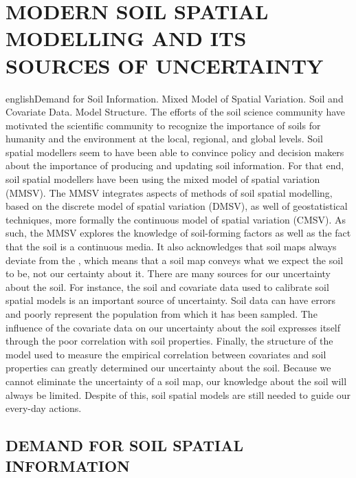 \artigotrue
\chapter{MODERN SOIL SPATIAL MODELLING AND ITS SOURCES OF UNCERTAINTY}
\label{chap:chap02}

\def\enkeys{Demand for Soil Information. Mixed Model of Spatial Variation. Soil and Covariate Data. Model 
Structure.}
  
\begin{chapterabstract}{english}{\enkeys}
The efforts of the soil science community have motivated the scientific community to recognize the importance 
of soils for humanity and the environment at the local, regional, and global levels. Soil spatial modellers 
seem to have been able to convince policy and decision makers about the importance of producing and updating 
soil information. For that end, soil spatial modellers have been using the mixed model of spatial variation 
(MMSV). The MMSV integrates aspects of  methods of soil spatial modelling, based on the discrete 
model of spatial variation (DMSV), as well of geostatistical techniques, more formally the continuous model of 
spatial variation (CMSV). As such, the MMSV explores the knowledge of soil-forming factors as well as the fact 
that the soil is a continuous media. It also acknowledges that soil maps always deviate from the , 
which means that a soil map conveys what we expect the soil to be, not our certainty about it. There are many 
sources for our uncertainty about the soil. For instance, the soil and covariate data used to calibrate soil 
spatial models is an important source of uncertainty. Soil data can have errors and poorly represent the 
population from which it has been sampled. The influence of the covariate data on our uncertainty about the 
soil expresses itself through the poor correlation with soil properties. Finally, the structure of the model 
used to measure the empirical correlation between covariates and soil properties can greatly determined our 
uncertainty about the soil. Because we cannot eliminate the uncertainty of a soil map, our knowledge about the 
soil will always be limited. Despite of this, soil spatial models are still needed to guide our every-day 
actions.
\end{chapterabstract}

\formatchapter

\section{DEMAND FOR SOIL SPATIAL INFORMATION}

